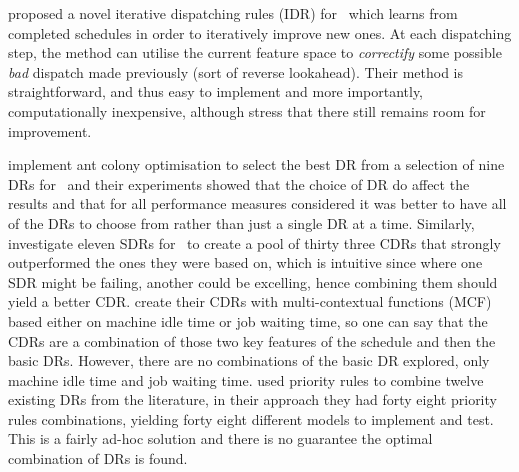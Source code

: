 \citet{Nguyen13} proposed a novel iterative dispatching rules (IDR) for \JSP\ which learns from completed schedules in order to iteratively improve new ones. At each dispatching step, the method can utilise the current feature space to \emph{correctify} some possible \emph{bad} dispatch made previously (sort of reverse lookahead).
Their method is straightforward, and thus easy to implement and more importantly, computationally inexpensive, although \citeauthor{Nguyen13} stress that there still remains room for improvement. 

\citet{Korytkowski13} implement ant colony optimisation to select the best DR from a selection of nine DRs for \JSP\ and their experiments showed that the choice of DR do affect the results and that for all performance measures considered it was better to have all of the DRs to choose from rather than just a single DR at a time. 
Similarly, \citet{Lu13} investigate eleven SDRs for \JSP\ to create a pool of thirty three CDRs that strongly outperformed the ones they were based on, which is intuitive since where one SDR might be failing, another could be excelling, hence combining them should yield a better CDR. \citeauthor{Lu13} create their CDRs with multi-contextual functions (MCF) based either on machine idle time or job waiting time, so one can say that the CDRs are a combination of those two key features of the schedule and then the basic DRs. However, there are no combinations of the basic DR explored, only machine idle time and job waiting time.  
\citet{Yu13} used priority rules to combine twelve existing DRs from the literature, in their approach they had forty eight priority rules combinations, yielding forty eight different models to implement and test. This is a fairly ad-hoc solution and there is no guarantee the optimal combination of DRs is found. 

\clearpage
